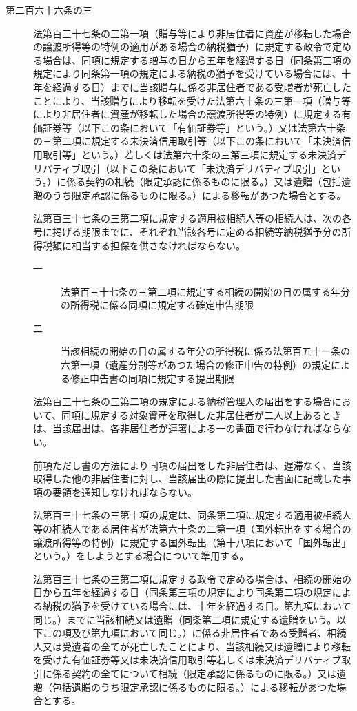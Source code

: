 \documentclass[twocolumn,a4j,10pt]{ltjtarticle}
\begin{document}
\begin{description}
\item[第二百六十六条の三]法第百三十七条の三第一項（贈与等により非居住者に資産が移転した場合の譲渡所得等の特例の適用がある場合の納税猶予）に規定する政令で定める場合は、同項に規定する贈与の日から五年を経過する日（同条第三項の規定により同条第一項の規定による納税の猶予を受けている場合には、十年を経過する日）までに当該贈与に係る非居住者である受贈者が死亡したことにより、当該贈与により移転を受けた法第六十条の三第一項（贈与等により非居住者に資産が移転した場合の譲渡所得等の特例）に規定する有価証券等（以下この条において「有価証券等」という。）又は法第六十条の三第二項に規定する未決済信用取引等（以下この条において「未決済信用取引等」という。）若しくは法第六十条の三第三項に規定する未決済デリバティブ取引（以下この条において「未決済デリバティブ取引」という。）に係る契約の相続（限定承認に係るものに限る。）又は遺贈（包括遺贈のうち限定承認に係るものに限る。）による移転があつた場合とする。
\item[]法第百三十七条の三第二項に規定する適用被相続人等の相続人は、次の各号に掲げる期限までに、それぞれ当該各号に定める相続等納税猶予分の所得税額に相当する担保を供さなければならない。
\begin{description}
\item[一]法第百三十七条の三第二項に規定する相続の開始の日の属する年分の所得税に係る同項に規定する確定申告期限
\item[二]当該相続の開始の日の属する年分の所得税に係る法第百五十一条の六第一項（遺産分割等があつた場合の修正申告の特例）の規定による修正申告書の同項に規定する提出期限
\end{description}
\item[]法第百三十七条の三第二項の規定による納税管理人の届出をする場合において、同項に規定する対象資産を取得した非居住者が二人以上あるときは、当該届出は、各非居住者が連署による一の書面で行わなければならない。
\item[]前項ただし書の方法により同項の届出をした非居住者は、遅滞なく、当該取得した他の非居住者に対し、当該届出の際に提出した書面に記載した事項の要領を通知しなければならない。
\item[]法第百三十七条の三第十項の規定は、同条第二項に規定する適用被相続人等の相続人である居住者が法第六十条の二第一項（国外転出をする場合の譲渡所得等の特例）に規定する国外転出（第十八項において「国外転出」という。）をしようとする場合について準用する。
\item[]法第百三十七条の三第二項に規定する政令で定める場合は、相続の開始の日から五年を経過する日（同条第三項の規定により同条第二項の規定による納税の猶予を受けている場合には、十年を経過する日。第九項において同じ。）までに当該相続又は遺贈（同条第二項に規定する遺贈をいう。以下この項及び第九項において同じ。）に係る非居住者である受贈者、相続人又は受遺者の全てが死亡したことにより、当該相続又は遺贈により移転を受けた有価証券等又は未決済信用取引等若しくは未決済デリバティブ取引に係る契約の全てについて相続（限定承認に係るものに限る。）又は遺贈（包括遺贈のうち限定承認に係るものに限る。）による移転があつた場合とする。

\end{description}
\end{document}
